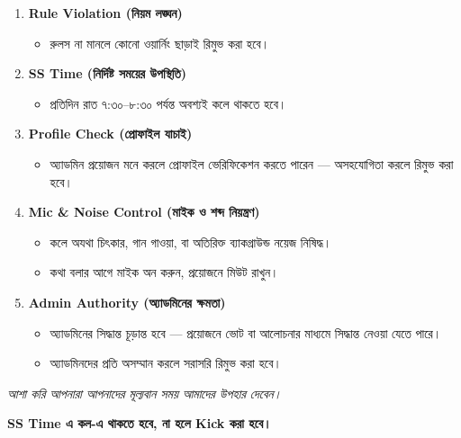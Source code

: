 \documentclass[12pt]{article}
\begin{document}
\begin{enumerate}[label=\arabic*., itemsep=10pt, leftmargin=*]
    \item \textbf{Rule Violation (নিয়ম লঙ্ঘন)}
    \begin{itemize}[label=$\diamond$]
        \item রুলস না মানলে কোনো ওয়ার্নিং ছাড়াই রিমুভ করা হবে।
    \end{itemize}

    \item \textbf{SS Time (নির্দিষ্ট সময়ের উপস্থিতি)}
    \begin{itemize}[label=$\diamond$]
        \item প্রতিদিন রাত ৭:৩০–৮:৩০ পর্যন্ত অবশ্যই কলে থাকতে হবে।
    \end{itemize}

    \item \textbf{Profile Check (প্রোফাইল যাচাই)}
    \begin{itemize}[label=$\diamond$]
        \item অ্যাডমিন প্রয়োজন মনে করলে প্রোফাইল ভেরিফিকেশন করতে পারেন — অসহযোগিতা করলে রিমুভ করা হবে।
    \end{itemize}

    \item \textbf{Mic \& Noise Control (মাইক ও শব্দ নিয়ন্ত্রণ)}
    \begin{itemize}[label=$\diamond$]
        \item কলে অযথা চিৎকার, গান গাওয়া, বা অতিরিক্ত ব্যাকগ্রাউন্ড নয়েজ নিষিদ্ধ।
        \item কথা বলার আগে মাইক অন করুন, প্রয়োজনে মিউট রাখুন।
    \end{itemize}

    \item \textbf{Admin Authority (অ্যাডমিনের ক্ষমতা)}
    \begin{itemize}[label=$\diamond$]
        \item অ্যাডমিনের সিদ্ধান্ত চূড়ান্ত হবে — প্রয়োজনে ভোট বা আলোচনার মাধ্যমে সিদ্ধান্ত নেওয়া যেতে পারে।
        \item অ্যাডমিনদের প্রতি অসম্মান করলে সরাসরি রিমুভ করা হবে।
    \end{itemize}
\end{enumerate}

\vspace{1cm}
\hrulefill
\vspace{0.5cm}

\begin{center}
    \large\itshape আশা করি আপনারা আপনাদের মূল্যবান সময় আমাদের উপহার দেবেন।\par
    \large\bfseries SS Time এ কল-এ থাকতে হবে, না হলে Kick করা হবে।
\end{center}
\end{document}
